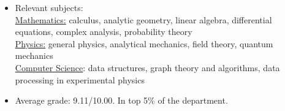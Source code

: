 \begin{itemize}
\item Relevant subjects: \\
	\underline{Mathematics:} calculus, analytic geometry, linear algebra, differential equations, complex analysis, probability theory\\
	\underline{Physics:} general physics, analytical mechanics, field theory, quantum mechanics\\
	\underline{Computer Science}: data structures, graph theory and algorithms, data processing in experimental physics \\
\item Average grade: 9.11/10.00. In top 5\% of the department.
\end{itemize}
